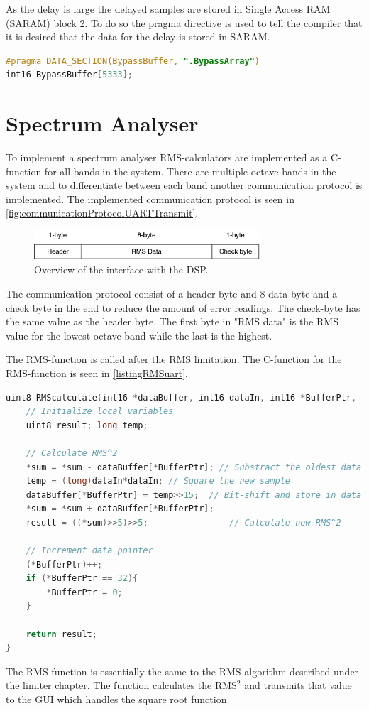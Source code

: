 As the delay is large the delayed samples are stored in Single Access RAM (SARAM) block 2. To do so the pragma directive is used to tell the compiler that it is desired that the data for the delay is stored in SARAM.

\begin{lstlisting}[language=C, caption = {Pragma for delay buffer for bypass.},label={listingPragma}]
#pragma DATA_SECTION(BypassBuffer, ".BypassArray")
int16 BypassBuffer[5333];
\end{lstlisting}


\section{Spectrum Analyser}

To implement a spectrum analyser RMS-calculators are implemented as a C-function for all bands in the system. There are multiple octave bands in the system and to differentiate between each band another communication protocol is implemented. The implemented communication protocol is seen in \autoref{fig:communicationProtocolUARTTransmit}.

\begin{figure}[H]
\centering
\includegraphics[width=0.75\textwidth]{figures/communicationProtocolUARTTransmit.pdf}
\caption{Overview of the interface with the DSP.}
\label{fig:communicationProtocolUARTTransmit}
\end{figure}

The communication protocol consist of a header-byte and 8 data byte and a check byte in the end to reduce the amount of error readings. The check-byte has the same value as the header byte. The first byte in "RMS data" is the RMS value for the lowest octave band while the last is the highest.

The RMS-function is called after the RMS limitation. The C-function for the RMS-function is seen in \autoref{listingRMSuart}.

\begin{lstlisting}[language=C, caption = {Calculate RMS value},label={listingRMSuart}]
uint8 RMScalculate(int16 *dataBuffer, int16 dataIn, int16 *BufferPtr, long *sum){
	// Initialize local variables
	uint8 result; long temp;
	
	// Calculate RMS^2
	*sum = *sum - dataBuffer[*BufferPtr]; // Substract the oldest data from sum
	temp = (long)dataIn*dataIn;	// Square the new sample
	dataBuffer[*BufferPtr] = temp>>15;	// Bit-shift and store in data buffer
	*sum = *sum + dataBuffer[*BufferPtr];
	result = ((*sum)>>5)>>5;				// Calculate new RMS^2
	
	// Increment data pointer
	(*BufferPtr)++;
	if (*BufferPtr == 32){ 
		*BufferPtr = 0;
	}
	
	return result;
}
\end{lstlisting}

The RMS function is essentially the same to the RMS algorithm described under the limiter chapter. The function calculates the RMS$^2$ and transmits that value to the GUI which handles the square root function.


